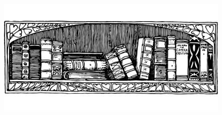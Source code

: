\documentclass[a5paper,pagesize,10pt,bibliography=totoc,numbers=enddot,
headings=normal,DIV=9,twoside=false,tablecaptionabove]{scrbook}
\begin{document}
\newcommand\medfan[1]{%
	\emph{medfan}\index[cadre]{Médiéval fantastique}
}%
\newcommand\generique[1]{%
	générique\index[cadre]{Générique}
}%
\newcommand\contemporain[1]{%
	contemporain\index[cadre]{Contemporain}
}%
\newcommand\guerrefroide[1]{%
	guerre froide\index[cadre]{Guerre froide}
}%
\newcommand\postapo[1]{%
	post-apo\index[cadre]{Post-apocalyptique}
}%
\newcommand\antique[1]{%
	Antiquité\index[cadre]{Antiquité}
}%
\newcommand\cyberpunk[1]{%
	\emph{cyberpunk}\index[cadre]{Cyberpunk/anticipation}
}%
\newcommand\superheros[1]{%
	super-héroïque\index[cadre]{Super-héroïque}
}%
\newcommand\pirate[1]{%
	pirate\index[cadre]{Piraterie}
}%
\newcommand\scifi[1]{%
	science-fiction\index[cadre]{Science-fiction}
}%
\newcommand\western[1]{%
	\emph{western}\index[cadre]{Western}
}%
\newcommand\steampunk[1]{%
	\emph{Steampunk}\index[cadre]{Steampunk}
}%
\newcommand\retro[1]{%
	\emph{entre-deux-guerres}\index[cadre]{Entre-deux-guerres}
}%

\newcommand\aventure[1]{%
	aventure\index[genre]{Aventure}
}%
\newcommand\action[1]{%
	action\index[genre]{Action}
}%
\newcommand\intrigue[1]{%
	intrigue\index[genre]{Intrigue}
}%
\newcommand\enquete[1]{%
	enquête\index[genre]{Enquête}
}%

\newcommand{\filltopageendgraphics}[2][]{%
  \par
  \zsaveposy{top-\thepage}%
  \vfill
  \zsaveposy{bottom-\thepage}%
  \def\thisheight{\dimexpr\zposy{top-\thepage}sp-\zposy{bottom-\thepage}sp\relax}
  \begin{figure}[h]
	\centering
	\texttt{[image: \#2]}
  \end{figure}
  \par
}%

\newfontfamily{}

\newcommand\illustration[2][0.5\textwidth]{%
	\begin{figure}[h]
		\centering
		\texttt{[image: images/\#2]}
	\end{figure}
}%

\newpage


\begingroup
\let\clearpage\relax
\begin{figure}[h!]
	\includegraphics[width=\textwidth]{images/books}
\end{figure}
\vspace{-3em}
\end{document}

